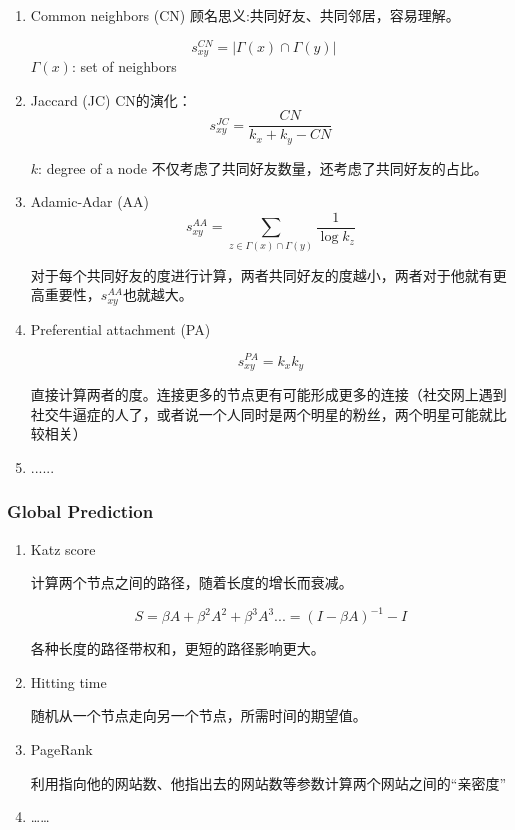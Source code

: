 \documentclass[letterpaper]{article} %
\begin{document}
\begin{enumerate}
	\item Common neighbors (CN) 
		顾名思义:共同好友、共同邻居，容易理解。
		
		$$s_{x y}^{C N}=|\Gamma(x) \cap \Gamma(y)| \quad $$ $\Gamma(x)$: set of neighbors 
		
	\item Jaccard (JC) 
		CN的演化：
		$$
		s_{x y}^{J C}=\frac{C N}{k_{x}+k_{y}-C N}
		$$
		
		$k$: degree of a node
		不仅考虑了共同好友数量，还考虑了共同好友的占比。
		
	\item Adamic-Adar (AA)
	$$s_{x y}^{A A}=\sum_{z \in \Gamma(x) \cap \Gamma(y)} \frac{1}{\log k_{z}}$$
	
	对于每个共同好友的度进行计算，两者共同好友的度越小，两者对于他就有更高重要性，$s_{x y}^{A A}$也就越大。
	
	\item Preferential attachment (PA)
	
	$$s_{xy}^{PA}=k_x k_y $$
	
	直接计算两者的度。连接更多的节点更有可能形成更多的连接（社交网上遇到社交牛逼症的人了，或者说一个人同时是两个明星的粉丝，两个明星可能就比较相关）
	
	\item ......
\end{enumerate}

\subsubsection{Global Prediction}

\begin{enumerate}
	\item Katz score
	
	计算两个节点之间的路径，随着长度的增长而衰减。
	
	$$ S = \beta A +\beta^2 A^2 + \beta^3 A^3 ... =(I-\beta A)^{-1}-I$$
	
	各种长度的路径带权和，更短的路径影响更大。
	
	\item Hitting time
	
	随机从一个节点走向另一个节点，所需时间的期望值。
	
	\item PageRank
	
	利用指向他的网站数、他指出去的网站数等参数计算两个网站之间的“亲密度”
	
	\item ……

\end{enumerate}
\end{document}
